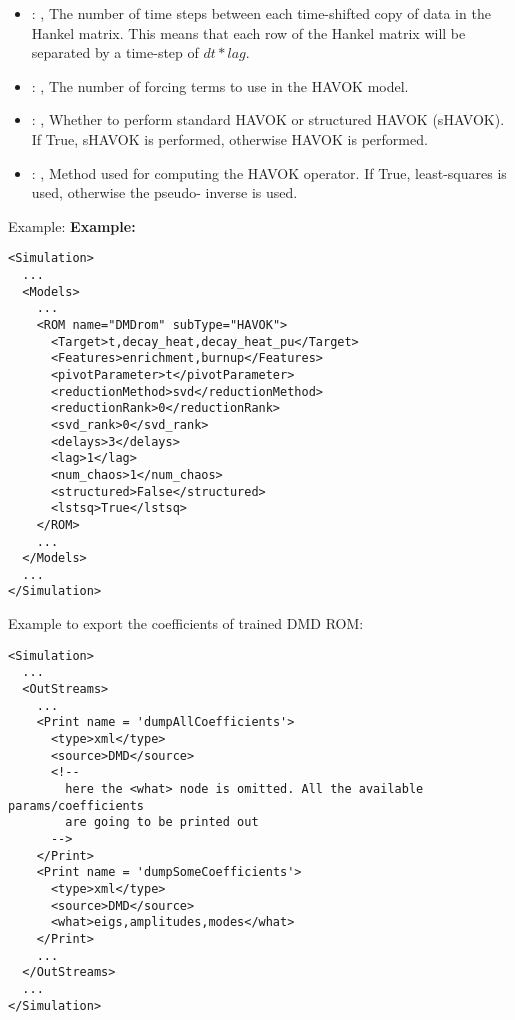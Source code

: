 \begin{itemize}
    \item {}: ,
      The number of time steps between each time-shifted copy of data in the Hankel matrix.
      This means that each row of the Hankel matrix will be separated by a time-step of $dt * lag$.

    \item {}: ,
      The number of forcing terms to use in the HAVOK model.

    \item {}: ,
      Whether to perform standard HAVOK or structured HAVOK (sHAVOK).
      If True, sHAVOK is performed, otherwise HAVOK is performed.

    \item {}: ,
      Method used for computing the HAVOK operator.
      If True, least-squares is used, otherwise the pseudo- inverse is used.
  \end{itemize}

\hspace{24pt}
Example:
\textbf{Example:}
\begin{lstlisting}[style=XML,morekeywords={name,subType}]
<Simulation>
  ...
  <Models>
    ...
    <ROM name="DMDrom" subType="HAVOK">
      <Target>t,decay_heat,decay_heat_pu</Target>
      <Features>enrichment,burnup</Features>
      <pivotParameter>t</pivotParameter>
      <reductionMethod>svd</reductionMethod>
      <reductionRank>0</reductionRank>
      <svd_rank>0</svd_rank>
      <delays>3</delays>
      <lag>1</lag>
      <num_chaos>1</num_chaos>
      <structured>False</structured>
      <lstsq>True</lstsq>
    </ROM>
    ...
  </Models>
  ...
</Simulation>
\end{lstlisting}

Example to export the coefficients of trained DMD ROM:
\begin{lstlisting}[style=XML,morekeywords={name,subType}]
<Simulation>
  ...
  <OutStreams>
    ...
    <Print name = 'dumpAllCoefficients'>
      <type>xml</type>
      <source>DMD</source>
      <!--
        here the <what> node is omitted. All the available params/coefficients
        are going to be printed out
      -->
    </Print>
    <Print name = 'dumpSomeCoefficients'>
      <type>xml</type>
      <source>DMD</source>
      <what>eigs,amplitudes,modes</what>
    </Print>
    ...
  </OutStreams>
  ...
</Simulation>
\end{lstlisting}


